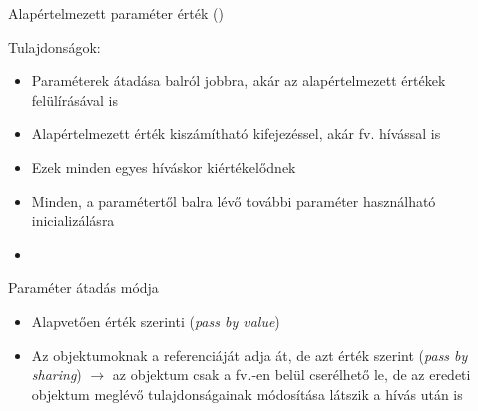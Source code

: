 \begin{frame}
    \begin{exampleblock}{Alapértelmezett paraméter érték ()}
        \small
        
    \end{exampleblock}
\end{frame}

\begin{frame}
    Tulajdonságok:
    \begin{itemize}
        \item Paraméterek átadása balról jobbra, akár az alapértelmezett értékek felülírásával is
        \item Alapértelmezett érték kiszámítható kifejezéssel, akár fv. hívással is
        \item Ezek minden egyes híváskor kiértékelődnek
        \item Minden, a paramétertől balra lévő további paraméter használható inicializálásra
        \item {}
    \end{itemize}
\end{frame}

\begin{frame}
    Paraméter átadás módja
    \begin{itemize}
        \item Alapvetően érték szerinti (\emph{pass by value})
        \item Az objektumoknak a referenciáját adja át, de azt érték szerint (\emph{pass by sharing}) $\to$ az objektum csak a fv.-en belül cserélhető le, de az eredeti objektum meglévő tulajdonságainak módosítása látszik a hívás után is
    \end{itemize}
\end{frame}

\begin{frame}
    \footnotesize
    \begin{exampleblock}{}
        \footnotesize
        \vspace{-0.3cm}
        
        \vspace{-0.3cm}
    \end{exampleblock}
\end{frame}

